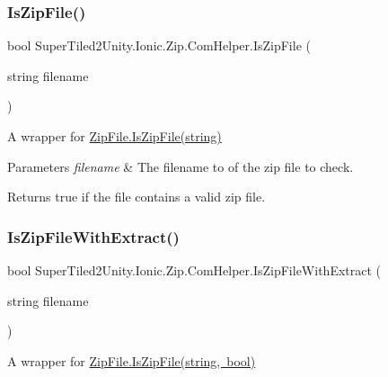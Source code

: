 \subsubsection{\texorpdfstring{Is\+Zip\+File()}{IsZipFile()}}
{\footnotesize\ttfamily bool Super\+Tiled2\+Unity.\+Ionic.\+Zip.\+Com\+Helper.\+Is\+Zip\+File (\begin{DoxyParamCaption}\item[{string}]{filename }\end{DoxyParamCaption})}



A wrapper for \mbox{\hyperlink{class_super_tiled2_unity_1_1_ionic_1_1_zip_1_1_zip_file_ae768213f1dc3cd7a1d62cf42af359d2b}{Zip\+File.\+Is\+Zip\+File(string)}} 


\begin{DoxyParams}{Parameters}
{\em filename} & The filename to of the zip file to check.\\
\hline
\end{DoxyParams}
\begin{DoxyReturn}{Returns}
true if the file contains a valid zip file.
\end{DoxyReturn}
\mbox{\label{class_super_tiled2_unity_1_1_ionic_1_1_zip_1_1_com_helper_a7c3db4a8898bc2bb48c6fa19193d295c}} 
\subsubsection{\texorpdfstring{Is\+Zip\+File\+With\+Extract()}{IsZipFileWithExtract()}}
{\footnotesize\ttfamily bool Super\+Tiled2\+Unity.\+Ionic.\+Zip.\+Com\+Helper.\+Is\+Zip\+File\+With\+Extract (\begin{DoxyParamCaption}\item[{string}]{filename }\end{DoxyParamCaption})}



A wrapper for \mbox{\hyperlink{class_super_tiled2_unity_1_1_ionic_1_1_zip_1_1_zip_file_abc936816e59ebc2a66ace620b6bc2632}{Zip\+File.\+Is\+Zip\+File(string, bool)}} 

